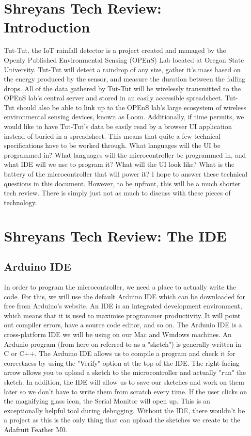 \documentclass[letterpaper,10pt,draftclsnofoot,onecolumn]{article}
\begin{document}
\section{Shreyans Tech Review: Introduction}
Tut-Tut, the IoT rainfall detector is a project created and managed by the Openly Published Environmental Sensing (OPEnS) Lab located at Oregon State University. Tut-Tut will detect a raindrop of any size, gather it's mass based on the energy produced by the sensor, and measure the duration between the falling drops. All of the data gathered by Tut-Tut will be wirelessly transmitted to the OPEnS lab's central server and stored in an easily accessible spreadsheet. Tut-Tut should also be able to link up to the OPEnS lab's large ecosystem of wireless environmental sensing devices, known as Loom. Additionally, if time permits, we would like to have Tut-Tut's data be easily read by a browser UI application instead of buried in a spreadsheet.
\newline
\newline
This means that quite a few technical specifications have to be worked through. What languages will the UI be programmed in? What languages will the microcontroller be programmed in, and what IDE will we use to program it? What will the UI look like? What is the battery of the microcontroller that will power it? I hope to answer these technical questions in this document. However, to be upfront, this will be a much shorter tech review. There is simply just not as much to discuss with these pieces of technology.

\section{Shreyans Tech Review: The IDE}
\subsection{Arduino IDE}
In order to program the microcontroller, we need a place to actually write the code. For this, we will use the default Arduino IDE which can be downloaded for free from Arduino's website. An IDE is an integrated development environment, which means that it is used to maximise programmer productivity. It will point out compiler errors, have a source code editor, and so on.
\newline
The Ardunio IDE is a cross-platform IDE we will be using on our Mac and Windows machines. An Ardunio program (from here on referred to as a "sketch") is generally written in C or C++. The Arduino IDE allows us to compile a program and check it for correctness by using the "Verify" option at the top of the IDE. The right facing arrow allows you to upload a sketch to the microcontroller and actually "run" the sketch. \cite{Intel}  
\newline
In addition, the IDE will allow us to save our sketches and work on them later so we don't have to write them from scratch every time. If the user clicks on the magnifying glass icon, the Serial Monitor will open up. This is an exceptionally helpful tool during debugging. \cite{Intel2}
\newline
Without the IDE, there wouldn't be a project as this is the only thing that can upload the sketches we create to the Adafruit Feather M0.
\end{document}

